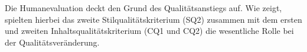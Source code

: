 \begin{figure}





















\captionsetup{width=.45\textwidth}
\begin{floatrow}
\end{floatrow}

\end{figure}

Die Humanevaluation deckt den Grund des Qualitätsanstiegs auf. Wie  zeigt, spielten hierbei das zweite Stilqualitätskriterium (SQ2) zusammen mit dem ersten und zweiten Inhaltsqualitätskriterium (CQ1 und CQ2) die wesentliche Rolle bei der Qualitätsveränderung.


